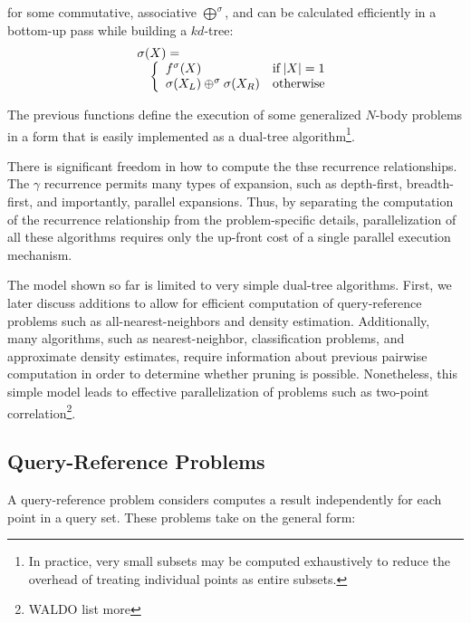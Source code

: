 \documentclass[times, 10pt,twocolumn]{article}
\DeclareMathOperator{\IF}{if}
\begin{document}
\noindent for some commutative, associative $\bigoplus^{\sigma}$, and can be calculated efficiently in a bottom-up pass while building a $kd$-tree:
\begin{equation}
\label{eqn:sigma}
 \begin{array}{ll}
  \lefteqn{\sigma(X) =}
  \\
  & \left\{
    \begin{array}{lr}
      f^{\sigma}(X) & \IF |X| = 1
      \\
      \sigma(X_L) \oplus^{\sigma} \sigma(X_R) & \mbox{otherwise}
    \end{array}
  \right.
 \end{array}
\end{equation}

\noindent The previous functions define the execution of some generalized $N$-body problems in a form that is easily implemented as a dual-tree algorithm\footnote{In practice, very small subsets may be computed exhaustively to reduce the overhead of treating individual points as entire subsets.}.

There is significant freedom in how to compute the thse recurrence relationships.
The $\gamma$ recurrence permits many types of expansion, such as depth-first, breadth-first, and importantly, parallel expansions.
Thus, by separating the computation of the recurrence relationship from the problem-specific details, parallelization of all these algorithms requires only the up-front cost of a single parallel execution mechanism.

The model shown so far is limited to very simple dual-tree algorithms.
First, we later discuss additions to allow for efficient computation of query-reference problems such as all-nearest-neighbors and density estimation.
Additionally, many algorithms, such as nearest-neighbor, classification problems, and approximate density estimates, require information about previous pairwise computation in order to determine whether pruning is possible.
Nonetheless, this simple model leads to effective parallelization of problems such as two-point correlation\footnote{WALDO list more}.

\subsection{Query-Reference Problems}


A query-reference problem considers computes a result independently for each point in a query set.
These problems take on the general form:
 
\end{document}
